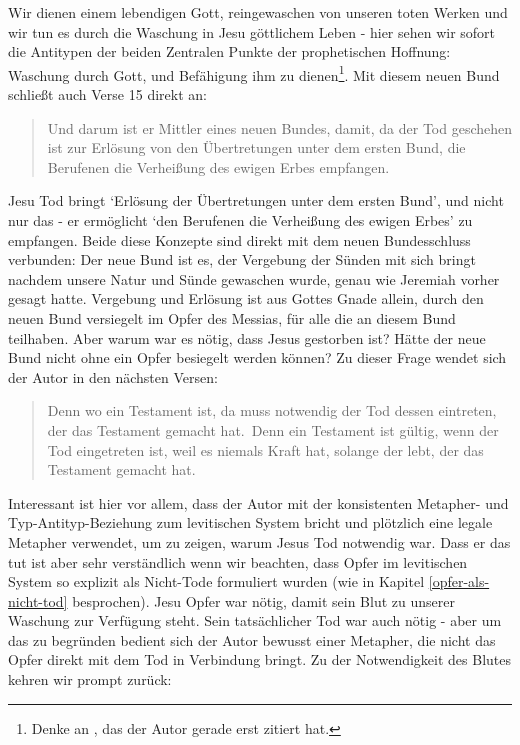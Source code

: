 Wir dienen einem lebendigen Gott, reingewaschen von unseren toten Werken und wir tun es durch die Waschung in Jesu göttlichem Leben -
hier sehen wir sofort die Antitypen der beiden Zentralen Punkte der prophetischen Hoffnung:
Waschung durch Gott, und Befähigung ihm zu dienen\footnote{
Denke an , das der Autor gerade erst zitiert hat.
}.
Mit diesem neuen Bund schließt auch Verse 15 direkt an:
\begin{quote}
	Und darum ist er Mittler eines neuen Bundes, damit, da der Tod geschehen ist zur Erlösung von den Übertretungen unter dem ersten Bund, die Berufenen die Verheißung des ewigen Erbes empfangen.
\end{quote}
Jesu Tod bringt `Erlösung der Übertretungen unter dem ersten Bund', und nicht nur das - er ermöglicht `den Berufenen die Verheißung des ewigen Erbes' zu empfangen.
Beide diese Konzepte sind direkt mit dem neuen Bundesschluss verbunden:
Der neue Bund ist es, der Vergebung der Sünden mit sich bringt nachdem unsere Natur und Sünde gewaschen wurde, genau wie Jeremiah vorher gesagt hatte.
Vergebung und Erlösung ist aus Gottes Gnade allein, durch den neuen Bund versiegelt im Opfer des Messias, für alle die an diesem Bund teilhaben.
Aber warum war es nötig, dass Jesus gestorben ist?
Hätte der neue Bund nicht ohne ein Opfer besiegelt werden können?
Zu dieser Frage wendet sich der Autor in den nächsten Versen:
\begin{quote}
	Denn wo ein Testament ist, da muss notwendig der Tod dessen eintreten, der das Testament gemacht hat. Denn ein Testament ist gültig, wenn der Tod eingetreten ist, weil es niemals Kraft hat, solange der lebt, der das Testament gemacht hat.
\end{quote}
Interessant ist hier vor allem, dass der Autor mit der konsistenten Metapher- und Typ-Antityp-Beziehung zum levitischen System bricht und plötzlich eine legale Metapher verwendet, um zu zeigen, warum Jesus Tod notwendig war.
Dass er das tut ist aber sehr verständlich wenn wir beachten, dass Opfer im levitischen System so explizit als Nicht-Tode formuliert wurden (wie in Kapitel \ref{opfer-als-nicht-tod} besprochen).
Jesu Opfer war nötig, damit sein Blut zu unserer Waschung zur Verfügung steht.
Sein tatsächlicher Tod war auch nötig - aber um das zu begründen bedient sich der Autor bewusst einer Metapher, die nicht das Opfer direkt mit dem Tod in Verbindung bringt.
Zu der Notwendigkeit des Blutes kehren wir prompt zurück:
